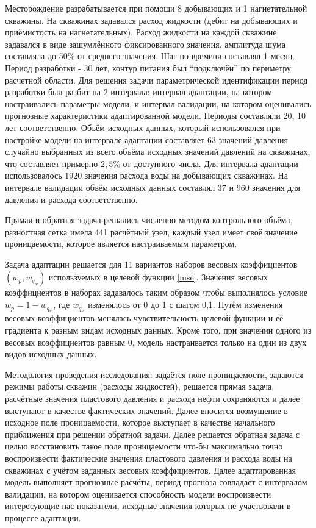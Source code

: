 \documentclass{article}
\begin{document}
Месторождение разрабатывается при помощи 8 добывающих и 1 нагнетательной скважины. На скважинах задавался расход жидкости (дебит на добывающих и приёмистость на нагнетательных), Расход жидкости на каждой скважине задавался в виде зашумлённого фиксированного значения, амплитуда шума составляла до $50\%$ от среднего значения. Шаг по времени составлял 1 месяц. Период разработки - 30 лет, контур питания был “подключён” по периметру расчетной области. Для решения задачи параметрической идентификации период разработки был разбит на 2 интервала: интервал адаптации, на котором настраивались параметры модели, и интервал валидации, на котором оценивались прогнозные характеристики адаптированной модели. Периоды составляли 20, 10 лет соответственно. Объём исходных данных, который использовался при настройке модели на интервале адаптации составляет 63 значений давления случайно выбранных из всего объёма исходных значений давлений на скважинах, что составляет примерно $2,5\%$ от доступного числа. Для интервала адаптации использовалось 1920 значения расхода воды на добывающих скважинах. На интервале валидации объём исходных данных составлял 37 и 960 значения для давления и расхода соответственно. 

Прямая и обратная задача решались численно методом контрольного объёма, разностная сетка имела 441 расчётный узел, каждый узел имеет своё значение проницаемости, которое является настраиваемым параметром.

Задача адаптации решается для 11 вариантов наборов весовых коэффициентов $(w_p, w_{q_w})$ используемых в целевой функции {\ref{mse}}. Значения весовых коэффициентов в наборах задавалось таким образом чтобы выполнялось условие $w_p = 1 - w_{q_w}$, где $w_{q_w}$ изменялось от 0 до 1 с шагом 0,1. Путём изменения весовых коэффициентов менялась чувствительность целевой функции и её градиента к разным видам исходных данных. Кроме того, при значении одного из весовых коэффициентов равным 0, модель настраивается только на один из двух видов исходных данных. 

Методология проведения исследования: задаётся поле проницаемости, задаются режимы работы скважин (расходы жидкостей), решается прямая задача, расчётные значения пластового давления и расхода нефти сохраняются и далее выступают в качестве фактических значений. Далее вносится возмущение в исходное поле проницаемости, которое выступает в качестве начального приближения при решении обратной задачи. Далее решается обратная задача с целью восстановить такое поле проницаемости что-бы максимально точно воспроизвести фактические значения пластового давления и расхода воды на скважинах с учётом заданных весовых коэффициентов. Далее адаптированная модель выполняет прогнозные расчёты, период прогноза совпадает с интервалом валидации, на котором оценивается способность модели воспроизвести интересующие нас показатели, исходные значения которых не участвовали в процессе адаптации. 
\end{document}
